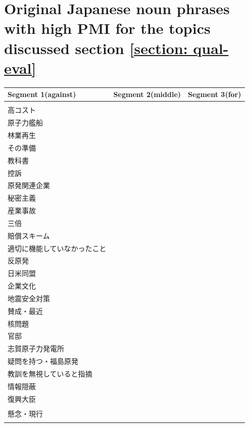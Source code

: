 \documentclass[final,5p,times,twocolumn,authoryear]{elsarticle}
\begin{document}
\FloatBarrier
\clearpage
\onecolumn
\section{Original Japanese noun phrases with high PMI for the topics discussed section \ref{section: qual-eval}}

\begin{table}[htbp]
\begin{CJK}{UTF8}{min}
\centering
\renewcommand{\arraystretch}{1.5}%
\begin{tabularx}{\textwidth}{|>{\centering\arraybackslash}X|>{\centering\arraybackslash}X|>{\centering\arraybackslash}X|}
\hline
\textbf{Segment 1(against)} & \textbf{Segment 2(middle)} & \textbf{Segment 3(for)} \\ \hline
\begin{tabular}[c]{@{}l@{}}
	自然エネルギー重視 \\ 高コスト \\ 原子力艦船 \\ 林業再生 \\ その準備 \\ 教科書 \\ 控訴 \\ 原発関連企業 \\ 秘密主義 \\ 産業事故 \\ 三倍 \\ 賠償スキーム \\ 適切に機能していなかったこと \\ 反原発 \\ 日米同盟 \\ 企業文化 \\ 地震安全対策 \\ 賛成・最近 \\ 核問題 \\ 官邸 \\ 志賀原子力発電所 \\ 疑問を持つ・福島原発 \\ 教訓を無視していると指摘 \\ 情報隠蔽 \\ 復興大臣 \\ 懸念・現行
\end{tabular} 
& 
\begin{tabular}[c]{@{}l@{}}


\end{tabular}
\end{tabularx}
\end{CJK}
\end{table}
\end{document}
